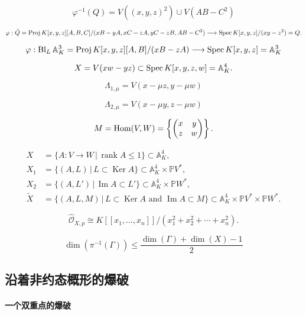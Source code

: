 \[
	\varphi^{-1}(Q)=V((x,y,z)^2)\cup V(AB-C^2)
\]

\[
	\varphi:\tilde Q=\operatorname{Proj} K[x,y,z][A,B,C]/(xB-yA,xC-zA,yC-zB,AB-C^2)\longrightarrow \operatorname{Spec} K[x,y,z]/(xy-z^2)=Q.
\]


\[
	\varphi:\operatorname{Bl}_L \mathbb A_K^3=\operatorname{Proj} K[x,y,z][A,B]/(xB-zA)\longrightarrow \operatorname{Spec} K[x,y,z]=\mathbb A_K^3
\]

\[
	X=V(xw-yz)\subset \operatorname{Spec} K[x,y,z,w]=\mathbb A_K^4.
\]

\[
\Lambda_{1,\mu}=V(x-\mu z,y-\mu w)
\]

\[
\Lambda_{2,\mu}=V(x-\mu y,z-\mu w)
\]


\[
	M=\operatorname{Hom}(V,W)=\left\{\begin{pmatrix}x&y\\z&w\end{pmatrix}\right\}.
\]

\[
	\begin{aligned}
		X&=\{A:V\to W\,|\,\operatorname{rank}A\leq 1\}\subset \mathbb A_K^4,\\
		X_1&=\{(A,L)\,|\,L\subset \operatorname{Ker}A\}\subset \mathbb A_K^4\times \mathbb PV^*,\\
		X_2&=\{(A,L')\,|\,\operatorname{Im}A\subset L'\}\subset \mathbb A_K^4\times \mathbb PW^*,\\
		\tilde X&=\{(A,L,M)\,|\, L\subset \operatorname{Ker}A\text{ and }\operatorname{Im}A\subset M\}\subset \mathbb A_K^4\times \mathbb PV^*\times \mathbb PW^*.
	\end{aligned}
\]

\[
	\hat{\mathscr O}_{X,p}\cong K[\![x_1,\dots,x_n]\!]/(x_1^2+x_2^2+\cdots+x_n^2).
\]

\[
	\dim (\pi^{-1}(\Gamma))\leq \frac{\dim(\Gamma)+\dim(X)-1}2
\]

\subsection{沿着非约态概形的爆破}\label{s:4.2.3}

\paragraph*{一个双重点的爆破}